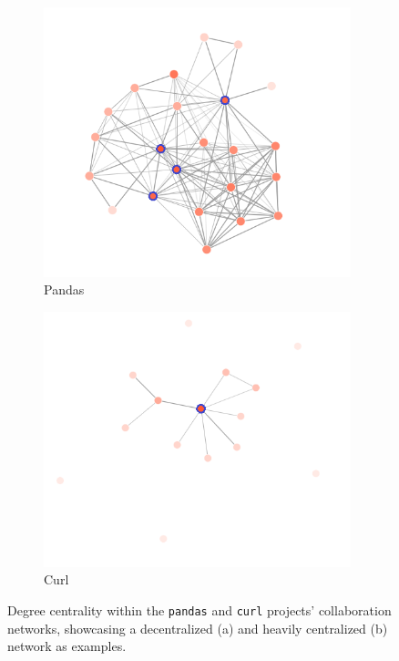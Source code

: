 \begin{figure}[!htbp]
    \centering
    \begin{subfigure}{0.49\textwidth}
        \centering
        \includegraphics[width=0.98\textwidth]{figures/degree_centrality.png}
        \caption{Pandas}
        \label{fig:centrality a}
    \end{subfigure}
    \hfill
    \begin{subfigure}{0.49\textwidth}
        \centering
        \includegraphics[width=0.98\textwidth]{figures/degree_centrality_curl.png}
        \caption{Curl}
        \label{fig:centrality b}
    \end{subfigure}
    \caption{Degree centrality within the \texttt{pandas} and \texttt{curl} projects' collaboration networks, showcasing a decentralized (a) and heavily centralized (b) network as examples.}
    \label{fig:degree centrality}
\end{figure}

